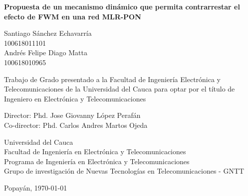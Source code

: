 \newpage
\thispagestyle{empty}
\begin{center}

    {\textbf{\large Propuesta de un mecanismo dinámico que permita contrarrestar el efecto de FWM en una red MLR-PON }}\\
    \vfill

    Santiago Sánchez Echavarría\\
    100618011101 \\
    Andrés Felipe Diago Matta\\
    100618010965 \\
    \vfill

    Trabajo de Grado presentado a la Facultad de Ingeniería Electrónica y Telecomunicaciones de la Universidad del Cauca para optar por el título de Ingeniero en Electrónica y Telecomunicaciones\\
    \vfill
    
    Director: Phd. Jose Giovanny López Perafán \\
    Co-director: Phd. Carlos Andres Martos Ojeda \\
    \vfill

    \vfill
    Universidad del Cauca\\
    Facultad de Ingeniería en Electrónica y Telecomunicaciones\\
    Programa de Ingeniería en Electrónica y Telecomunicaciones\\
    Grupo de investigación de Nuevas Tecnologías en Telecomunicaciones - GNTT\\
    \date{\today}
    Popayán, \today
\end{center} 
